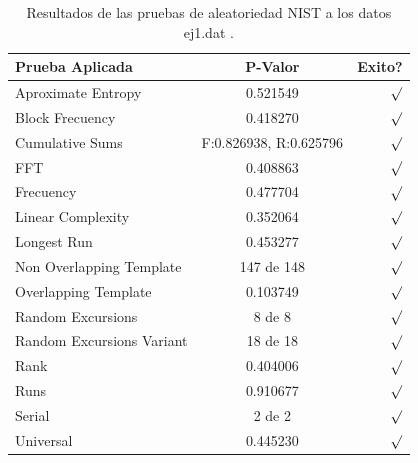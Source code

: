 \documentclass[10pt]{IEEEtran}
\begin{document}
\begin{table}[H]
\caption{Resultados de las pruebas de aleatoriedad NIST a los datos ej1.dat .}
\label{caso1}
\begin{center}
\begin{small}
\begin{tabular}{|l|c|r|}
\hline

Prueba Aplicada &  P-Valor & Exito? \\
\hline

Aproximate Entropy    &    0.521549  & $\surd$ \\

Block Frecuency  & 0.418270  &  $\surd$  \\

Cumulative Sums    &   F:0.826938, R:0.625796  & $\surd$ \\

FFT    &   0.408863 &  $\surd$     \\

Frecuency     &  0.477704  &  $\surd$   \\

Linear Complexity      & 0.352064 & $\surd$ \\

Longest Run      &   0.453277 &    $\surd$      \\

Non Overlapping Template      & 147 de 148    &     $\surd$          \\

Overlapping Template      &  0.103749   &      $\surd$      \\

Random Excursions      & 8 de 8  &    $\surd$      \\

Random Excursions Variant & 18 de 18 &     $\surd$    \\

Rank &  0.404006 &      $\surd$      \\

Runs &    0.910677 &     $\surd$        \\

Serial &     2 de 2    &     $\surd$        \\

Universal &     0.445230  &   $\surd$            \\

\hline

\end{tabular}
\end{small}
\end{center}
\end{table}
\end{document}
